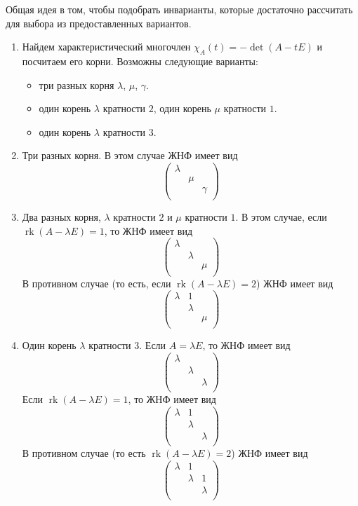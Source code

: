 \documentclass{article}
\newcommand{\rk}{\operatorname{rk}}
\begin{document}
Общая идея в том, чтобы подобрать инварианты, которые достаточно рассчитать для выбора из предоставленных вариантов.
\begin{enumerate}
\item Найдем характеристический многочлен $\chi_A(t) = - \det(A - tE)$ и посчитаем его корни.
Возможны следующие варианты:
\begin{itemize}
\item три разных корня $\lambda$, $\mu$, $\gamma$.

\item один корень $\lambda$ кратности $2$, один корень $\mu$ кратности $1$.

\item один корень $\lambda$ кратности $3$.
\end{itemize}

\item Три разных корня.
В этом случае ЖНФ имеет вид
\[
\begin{pmatrix}
{\lambda}&{}&{}\\
{}&{\mu}&{}\\
{}&{}&{\gamma}\\
\end{pmatrix}
\]

\item Два разных корня, $\lambda$ кратности $2$ и $\mu$ кратности $1$.
В этом случае, если $\rk (A - \lambda E) = 1$, то ЖНФ имеет вид
\[
\begin{pmatrix}
{\lambda}&{}&{}\\
{}&{\lambda}&{}\\
{}&{}&{\mu}\\
\end{pmatrix}
\]
В противном случае (то есть, если $\rk(A-\lambda E) = 2$) ЖНФ имеет вид
\[
\begin{pmatrix}
{\lambda}&{1}&{}\\
{}&{\lambda}&{}\\
{}&{}&{\mu}\\
\end{pmatrix}
\]

\item Один корень $\lambda$ кратности $3$.
Если $A = \lambda E$, то ЖНФ имеет вид
\[
\begin{pmatrix}
{\lambda}&{}&{}\\
{}&{\lambda}&{}\\
{}&{}&{\lambda}\\
\end{pmatrix}
\]
Если $\rk(A-\lambda E) = 1$, то ЖНФ имеет вид
\[
\begin{pmatrix}
{\lambda}&{1}&{}\\
{}&{\lambda}&{}\\
{}&{}&{\lambda}\\
\end{pmatrix}
\]
В противном случае (то есть $\rk(A - \lambda E) = 2$) ЖНФ имеет вид
\[
\begin{pmatrix}
{\lambda}&{1}&{}\\
{}&{\lambda}&{1}\\
{}&{}&{\lambda}\\
\end{pmatrix}
\]
\end{enumerate}
\end{document}
